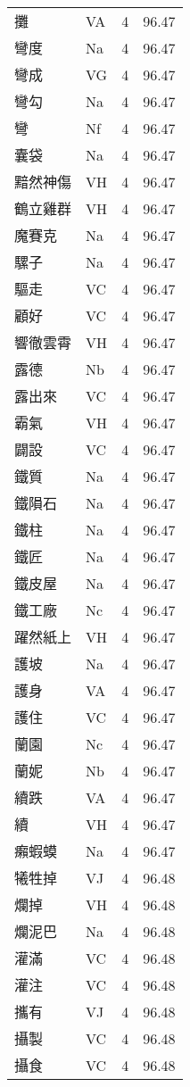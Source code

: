\documentclass[twocolumn]{book}
\begin{document}
\begin{supertabular}{llrr}
攤 & VA & 4 &  96.47\\
彎度 & Na & 4 &  96.47\\
彎成 & VG & 4 &  96.47\\
彎勾 & Na & 4 &  96.47\\
彎 & Nf & 4 &  96.47\\
囊袋 & Na & 4 &  96.47\\
黯然神傷 & VH & 4 &  96.47\\
鶴立雞群 & VH & 4 &  96.47\\
魔賽克 & Na & 4 &  96.47\\
騾子 & Na & 4 &  96.47\\
驅走 & VC & 4 &  96.47\\
顧好 & VC & 4 &  96.47\\
響徹雲霄 & VH & 4 &  96.47\\
露德 & Nb & 4 &  96.47\\
露出來 & VC & 4 &  96.47\\
霸氣 & VH & 4 &  96.47\\
闢設 & VC & 4 &  96.47\\
鐵質 & Na & 4 &  96.47\\
鐵隕石 & Na & 4 &  96.47\\
鐵柱 & Na & 4 &  96.47\\
鐵匠 & Na & 4 &  96.47\\
鐵皮屋 & Na & 4 &  96.47\\
鐵工廠 & Nc & 4 &  96.47\\
躍然紙上 & VH & 4 &  96.47\\
護坡 & Na & 4 &  96.47\\
護身 & VA & 4 &  96.47\\
護住 & VC & 4 &  96.47\\
蘭園 & Nc & 4 &  96.47\\
蘭妮 & Nb & 4 &  96.47\\
續跌 & VA & 4 &  96.47\\
續 & VH & 4 &  96.47\\
癩蝦蟆 & Na & 4 &  96.47\\
犧牲掉 & VJ & 4 &  96.48\\
爛掉 & VH & 4 &  96.48\\
爛泥巴 & Na & 4 &  96.48\\
灌滿 & VC & 4 &  96.48\\
灌注 & VC & 4 &  96.48\\
攜有 & VJ & 4 &  96.48\\
攝製 & VC & 4 &  96.48\\
攝食 & VC & 4 &  96.48\\

\end{supertabular}
\end{document}
